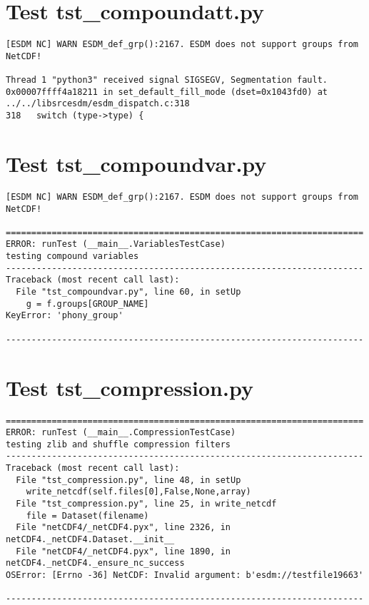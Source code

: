 \section{Test tst\_compoundatt.py}

\begin{verbatim}
[ESDM NC] WARN ESDM_def_grp():2167. ESDM does not support groups from NetCDF!

Thread 1 "python3" received signal SIGSEGV, Segmentation fault.
0x00007ffff4a18211 in set_default_fill_mode (dset=0x1043fd0) at ../../libsrcesdm/esdm_dispatch.c:318
318	  switch (type->type) {
\end{verbatim}

\section{Test tst\_compoundvar.py}

\begin{verbatim}
[ESDM NC] WARN ESDM_def_grp():2167. ESDM does not support groups from NetCDF!

======================================================================
ERROR: runTest (__main__.VariablesTestCase)
testing compound variables
----------------------------------------------------------------------
Traceback (most recent call last):
  File "tst_compoundvar.py", line 60, in setUp
    g = f.groups[GROUP_NAME]
KeyError: 'phony_group'

----------------------------------------------------------------------
\end{verbatim}

\section{Test tst\_compression.py}

\begin{verbatim}
======================================================================
ERROR: runTest (__main__.CompressionTestCase)
testing zlib and shuffle compression filters
----------------------------------------------------------------------
Traceback (most recent call last):
  File "tst_compression.py", line 48, in setUp
    write_netcdf(self.files[0],False,None,array)
  File "tst_compression.py", line 25, in write_netcdf
    file = Dataset(filename)
  File "netCDF4/_netCDF4.pyx", line 2326, in netCDF4._netCDF4.Dataset.__init__
  File "netCDF4/_netCDF4.pyx", line 1890, in netCDF4._netCDF4._ensure_nc_success
OSError: [Errno -36] NetCDF: Invalid argument: b'esdm://testfile19663'

----------------------------------------------------------------------
\end{verbatim}

